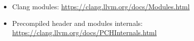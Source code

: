 \begin{itemize}
\item
Clang modules: \url{https://clang.llvm.org/docs/Modules.html}

\item
Precompiled header and modules internals: \url{https://clang.llvm.org/docs/PCHInternals.html}
\end{itemize}